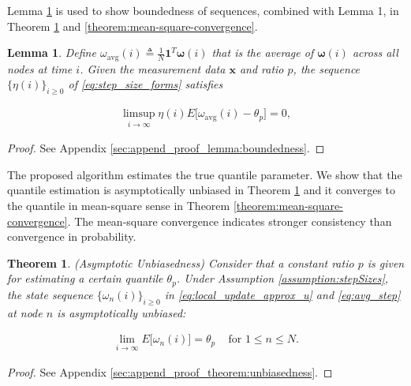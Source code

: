 \documentclass[journal]{IEEEtran}
\newtheorem{theorem}{Theorem}
\newtheorem{lemma}{Lemma}
\begin{document}
{}{Lemma \ref{lemma:boundedness} is used to show boundedness of sequences, combined with Lemma 1, in Theorem \ref{theorem:unbiasedness} and \ref{theorem:mean-square-convergence}.}
\begin{lemma}
	Define $\omega_{\text{avg}}(i) \triangleq \frac{1}{N} \mathbf{1}^T \bm{\omega}(i)$ that is the average of $\bm{\omega}(i)$ across all nodes at time $i$. Given the measurement data $\mathbf{x}$ and ratio $p$, the sequence $\{\eta(i)\}_{i \ge 0}$ of \eqref{eq:step_size_forms} satisfies
	
	\vspace{-4mm}
	\small
	\begin{align}
	\limsup_{i \to \infty} \eta(i) E \Big[\omega_{\text{avg}}(i) - \theta_p \Big] = 0, \label{eq:lemma:boundedness0} 
	\end{align}	\label{lemma:boundedness}
	\normalsize
\end{lemma}
\begin{proof}\vspace{-5mm}
	See Appendix \ref{sec:append_proof_lemma:boundedness}.
\end{proof}

{}{The proposed algorithm estimates the true quantile parameter. We show that the quantile estimation is asymptotically unbiased in Theorem \ref{theorem:unbiasedness} and it converges to the quantile in mean-square sense in Theorem \ref{theorem:mean-square-convergence}. The mean-square convergence indicates stronger consistency than convergence in probability.}

\begin{theorem}
	(Asymptotic Unbiasedness) Consider that a constant ratio $p$ is given for estimating a certain quantile $\theta_p$. Under Assumption \ref{assumption:stepSizes}, the state sequence $\{\omega_n(i)\}_{i \ge 0}$ in \eqref{eq:local_update_approx_u} and \eqref{eq:avg_step} at node $n$ is asymptotically unbiased:
	
	\vspace{-4mm}
	\small
	\begin{align}
	\lim_{i \to \infty} E\big[\omega_n(i)\big] = \theta_p\,\,\,\,\,\,\,\text{for }1\le n \le N.
	\end{align} \label{theorem:unbiasedness}
	\normalsize
\end{theorem}
\begin{proof}\vspace{-5mm}
	See Appendix \ref{sec:append_proof_theorem:unbiasedness}.
\end{proof}
\end{document}
